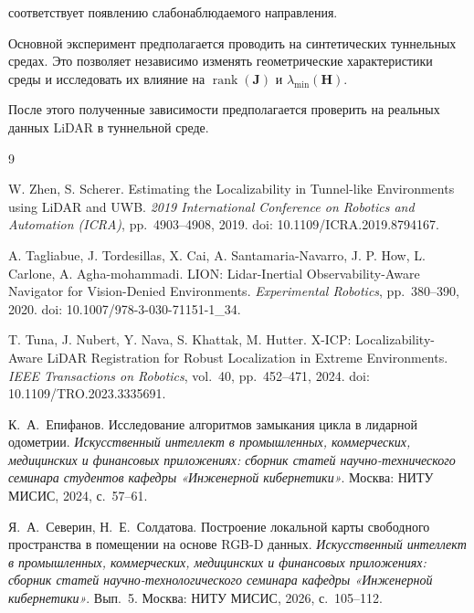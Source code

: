 \documentclass{misisarticle}
\begin{document}
соответствует появлению слабонаблюдаемого направления.

Основной эксперимент предполагается проводить на синтетических
туннельных средах. Это позволяет независимо изменять геометрические
характеристики среды и исследовать их влияние на
$\operatorname{rank}(\mathbf{J})$ и
$\lambda_{\min}(\mathbf{H})$.

После этого полученные зависимости предполагается проверить
на реальных данных LiDAR в туннельной среде.


\begin{thebibliography}{9}

W. Zhen, S. Scherer.
Estimating the Localizability in Tunnel-like Environments using
LiDAR and UWB.
\textit{2019 International Conference on Robotics and Automation
(ICRA)}, pp.~4903--4908, 2019.
doi: 10.1109/ICRA.2019.8794167.

A. Tagliabue, J. Tordesillas, X. Cai,
A. Santamaria-Navarro, J. P. How, L. Carlone,
A. Agha-mohammadi.
LION: Lidar-Inertial Observability-Aware Navigator
for Vision-Denied Environments.
\textit{Experimental Robotics},
pp.~380--390, 2020.
doi: 10.1007/978-3-030-71151-1\_34.

T. Tuna, J. Nubert, Y. Nava, S. Khattak, M. Hutter.
X-ICP: Localizability-Aware LiDAR Registration
for Robust Localization in Extreme Environments.
\textit{IEEE Transactions on Robotics},
vol.~40, pp.~452--471, 2024.
doi: 10.1109/TRO.2023.3335691.

К.~А.~Епифанов.
Исследование алгоритмов замыкания цикла
в лидарной одометрии.
\textit{Искусственный интеллект в промышленных,
коммерческих, медицинских и финансовых приложениях:
сборник статей научно-технического семинара студентов
кафедры «Инженерной кибернетики»}.
Москва: НИТУ МИСИС, 2024, с.~57--61.

Я.~А.~Северин, Н.~Е.~Солдатова.
Построение локальной карты свободного пространства
в помещении на основе RGB-D данных.
\textit{Искусственный интеллект в промышленных,
коммерческих, медицинских и финансовых приложениях:
сборник статей научно-технологического семинара
кафедры «Инженерной кибернетики»}.
Вып.~5.
Москва: НИТУ МИСИС, 2026, с.~105--112.


\end{thebibliography}
\end{document}
